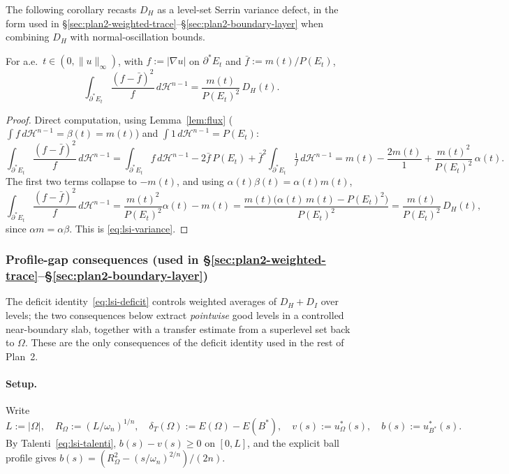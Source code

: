 The following corollary recasts $D_{H}$ as a level-set Serrin variance
defect, in the form used in
\S\ref{sec:plan2-weighted-trace}--\S\ref{sec:plan2-boundary-layer} when
combining $D_{H}$ with normal-oscillation bounds.

\begin{corollary}\label{cor:variance}
For a.e.\ $t\in(0,\|u\|_{\infty})$, with $f:=|\nabla u|$ on
$\partial^{*}E_{t}$ and $\bar f:=m(t)/P(E_{t})$,
\begin{equation}\label{eq:lsi-variance}
   \int_{\partial^{*}E_{t}}\frac{(f-\bar f)^{2}}{f}\,d\mathcal H^{n-1}
   =\frac{m(t)}{P(E_{t})^{2}}\,D_{H}(t).
\end{equation}
\end{corollary}

\begin{proof}
Direct computation, using Lemma~\ref{lem:flux} ($\int f\,d\mathcal H^{n-1}
=\beta(t)=m(t)$) and $\int 1\,d\mathcal H^{n-1}=P(E_{t})$:
\[
   \int_{\partial^{*}E_{t}}\!\frac{(f-\bar f)^{2}}{f}\,d\mathcal H^{n-1}
   =\int_{\partial^{*}E_{t}}\!\!f\,d\mathcal H^{n-1}
    -2\bar f\,P(E_{t})
    +\bar f^{2}\!\int_{\partial^{*}E_{t}}\!\!\tfrac{1}{f}\,d\mathcal H^{n-1}
   =m(t)-\frac{2 m(t)}{1}+\frac{m(t)^{2}}{P(E_{t})^{2}}\,\alpha(t).
\]
The first two terms collapse to $-m(t)$, and using
$\alpha(t)\beta(t)=\alpha(t)m(t)$,
\[
   \int_{\partial^{*}E_{t}}\!\frac{(f-\bar f)^{2}}{f}\,d\mathcal H^{n-1}
   =\frac{m(t)^{2}}{P(E_{t})^{2}}\alpha(t)-m(t)
   =\frac{m(t)\bigl(\alpha(t)\,m(t)-P(E_{t})^{2}\bigr)}{P(E_{t})^{2}}
   =\frac{m(t)}{P(E_{t})^{2}}\,D_{H}(t),
\]
since $\alpha m=\alpha\beta$. This is \eqref{eq:lsi-variance}.
\end{proof}

\subsubsection{Profile-gap consequences (used in
\S\ref{sec:plan2-weighted-trace}--\S\ref{sec:plan2-boundary-layer})}
\label{sssec:lsi-consequences}

The deficit identity~\eqref{eq:lsi-deficit} controls weighted averages
of $D_{H}+D_{I}$ over levels; the two consequences below extract
{\it pointwise} good levels in a controlled near-boundary slab, together
with a transfer estimate from a superlevel set back to $\Omega$. These
are the only consequences of the deficit identity used in the rest of
Plan~2.

\paragraph{Setup.} Write
\[
   L:=|\Omega|,\quad
   R_{\Omega}:=(L/\omega_{n})^{1/n},\quad
   \delta_{T}(\Omega):=E(\Omega)-E(B^{*}),\quad
   v(s):=u_{\Omega}^{*}(s),\quad
   b(s):=u_{B^{*}}^{*}(s).
\]
By Talenti~\eqref{eq:lsi-talenti}, $b(s)-v(s)\ge 0$ on $[0,L]$, and the
explicit ball profile gives
$b(s)=(R_{\Omega}^{2}-(s/\omega_{n})^{2/n})/(2n)$.

